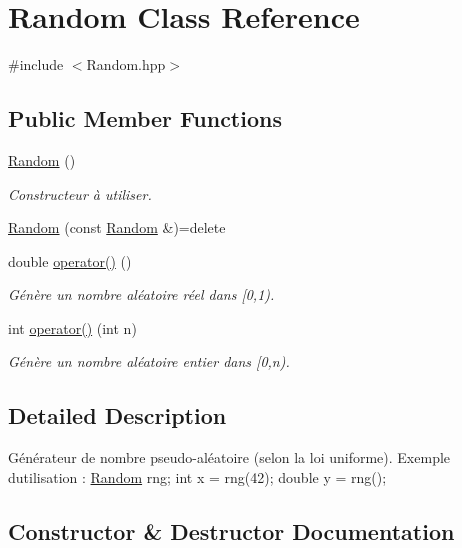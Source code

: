 \hypertarget{classRandom}{}\section{Random Class Reference}
\label{classRandom}


{\ttfamily \#include $<$Random.\+hpp$>$}

\subsection*{Public Member Functions}
\begin{DoxyCompactItemize}
\item 
\hyperlink{classRandom_acb76b49c3903a3c4fb67fd216341f08d}{Random} ()
\begin{DoxyCompactList}\small\item\em Constructeur à utiliser. \end{DoxyCompactList}\item 
\hyperlink{classRandom_a9bfadeaa4adc5ac44142d000b1c99441}{Random} (const \hyperlink{classRandom}{Random} \&)=delete
\item 
double \hyperlink{classRandom_aa0277ecffaf7d920b8ebd2399214f113}{operator()} ()
\begin{DoxyCompactList}\small\item\em Génère un nombre aléatoire réel dans \mbox{[}0,1). \end{DoxyCompactList}\item 
int \hyperlink{classRandom_a20265a86364664d85253931dc4685fa3}{operator()} (int n)
\begin{DoxyCompactList}\small\item\em Génère un nombre aléatoire entier dans \mbox{[}0,n). \end{DoxyCompactList}\end{DoxyCompactItemize}


\subsection{Detailed Description}
Générateur de nombre pseudo-\/aléatoire (selon la loi uniforme). Exemple d\textquotesingle{}utilisation \+: \hyperlink{classRandom}{Random} rng; int x = rng(42); double y = rng(); 

\subsection{Constructor \& Destructor Documentation}
\mbox{\label{classRandom_acb76b49c3903a3c4fb67fd216341f08d}} 
